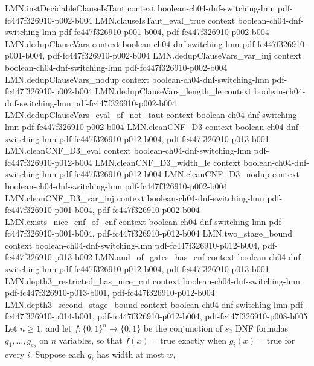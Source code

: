 \begin{theorem}
  {LMN.instDecidableClauseIsTaut}
  {context}
  {boolean-ch04-dnf-switching-lmn}
  {pdf-fc447f326910-p002-b004}
\proofstep
  {LMN.clauseIsTaut_eval_true}
  {context}
  {boolean-ch04-dnf-switching-lmn}
  {pdf-fc447f326910-p001-b004,
    pdf-fc447f326910-p002-b004}
\proofstep
  {LMN.dedupClauseVars}
  {context}
  {boolean-ch04-dnf-switching-lmn}
  {pdf-fc447f326910-p001-b004,
    pdf-fc447f326910-p002-b004}
\proofstep
  {LMN.dedupClauseVars_var_inj}
  {context}
  {boolean-ch04-dnf-switching-lmn}
  {pdf-fc447f326910-p002-b004}
\proofstep
  {LMN.dedupClauseVars_nodup}
  {context}
  {boolean-ch04-dnf-switching-lmn}
  {pdf-fc447f326910-p002-b004}
\proofstep
  {LMN.dedupClauseVars_length_le}
  {context}
  {boolean-ch04-dnf-switching-lmn}
  {pdf-fc447f326910-p002-b004}
\proofstep
  {LMN.dedupClauseVars_eval_of_not_taut}
  {context}
  {boolean-ch04-dnf-switching-lmn}
  {pdf-fc447f326910-p002-b004}
\proofstep
  {LMN.cleanCNF_D3}
  {context}
  {boolean-ch04-dnf-switching-lmn}
  {pdf-fc447f326910-p012-b004,
    pdf-fc447f326910-p013-b001}
\proofstep
  {LMN.cleanCNF_D3_eval}
  {context}
  {boolean-ch04-dnf-switching-lmn}
  {pdf-fc447f326910-p012-b004}
\proofstep
  {LMN.cleanCNF_D3_width_le}
  {context}
  {boolean-ch04-dnf-switching-lmn}
  {pdf-fc447f326910-p012-b004}
\proofstep
  {LMN.cleanCNF_D3_nodup}
  {context}
  {boolean-ch04-dnf-switching-lmn}
  {pdf-fc447f326910-p002-b004}
\proofstep
  {LMN.cleanCNF_D3_var_inj}
  {context}
  {boolean-ch04-dnf-switching-lmn}
  {pdf-fc447f326910-p001-b004,
    pdf-fc447f326910-p002-b004}
\proofstep
  {LMN.exists_nice_cnf_of_cnf}
  {context}
  {boolean-ch04-dnf-switching-lmn}
  {pdf-fc447f326910-p001-b004,
    pdf-fc447f326910-p012-b004}
\proofstep
  {LMN.two_stage_bound}
  {context}
  {boolean-ch04-dnf-switching-lmn}
  {pdf-fc447f326910-p012-b004,
    pdf-fc447f326910-p013-b002}
\proofstep
  {LMN.and_of_gates_has_cnf}
  {context}
  {boolean-ch04-dnf-switching-lmn}
  {pdf-fc447f326910-p012-b004,
    pdf-fc447f326910-p013-b001}
\proofstep
  {LMN.depth3_restricted_has_nice_cnf}
  {context}
  {boolean-ch04-dnf-switching-lmn}
  {pdf-fc447f326910-p013-b001,
    pdf-fc447f326910-p012-b004}
\proofstep
  {LMN.depth3_second_stage_bound}
  {context}
  {boolean-ch04-dnf-switching-lmn}
  {pdf-fc447f326910-p014-b001,
    pdf-fc447f326910-p012-b004,
    pdf-fc447f326910-p008-b005}
Let $n \ge 1$, and let $f : \{0,1\}^n \to \{0,1\}$ be the conjunction of $s_2$ DNF
formulas $g_1, \dots, g_{s_2}$ on $n$ variables, so that $f(x) = \mathrm{true}$ exactly
when $g_i(x) = \mathrm{true}$ for every $i$. Suppose each $g_i$ has width at most $w$,

\end{theorem}
